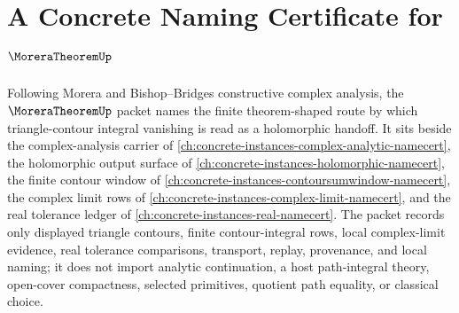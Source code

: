 \chapter{A Concrete Naming Certificate for $\MoreraTheoremUp$}
\label{ch:concrete-instances-morera-theorem-namecert}

Following Morera and Bishop--Bridges constructive complex analysis, the $\MoreraTheoremUp$ packet names the finite theorem-shaped route by which triangle-contour integral vanishing is read as a holomorphic handoff. It sits beside the complex-analysis carrier of \autoref{ch:concrete-instances-complex-analytic-namecert}, the holomorphic output surface of \autoref{ch:concrete-instances-holomorphic-namecert}, the finite contour window of \autoref{ch:concrete-instances-contoursumwindow-namecert}, the complex limit rows of \autoref{ch:concrete-instances-complex-limit-namecert}, and the real tolerance ledger of \autoref{ch:concrete-instances-real-namecert}. The packet records only displayed triangle contours, finite contour-integral rows, local complex-limit evidence, real tolerance comparisons, transport, replay, provenance, and local naming; it does not import analytic continuation, a host path-integral theory, open-cover compactness, selected primitives, quotient path equality, or classical choice.

